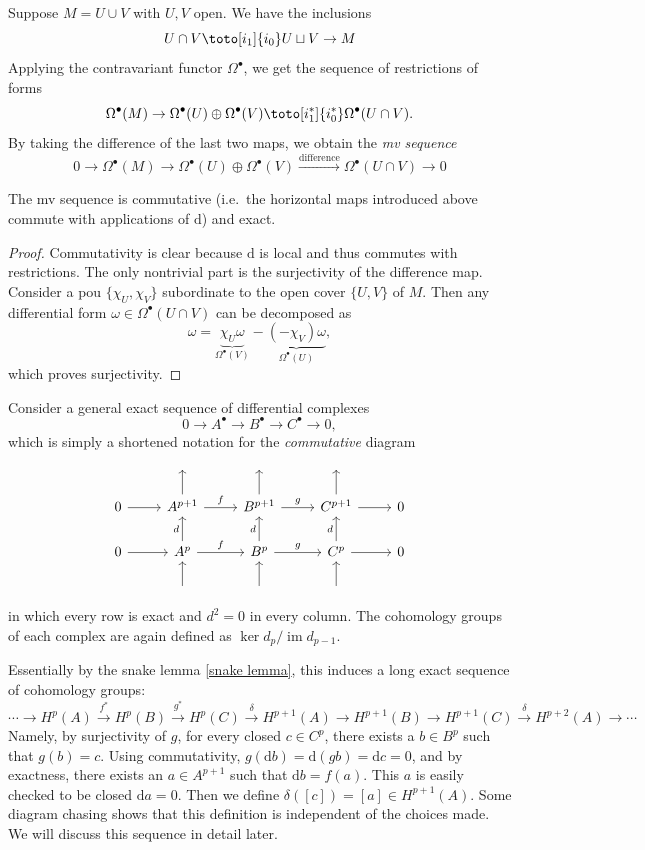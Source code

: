\documentclass[english,letterpaper]{article}%
\numberwithin{equation}{section}
\numberwithin{figure}{section}
\numberwithin{table}{section}
\theoremstyle{definition}
\theoremstyle{definition}
\theoremstyle{definition}
\theoremstyle{plain}
\theoremstyle{plain}
\theoremstyle{plain}
\theoremstyle{plain}
\theoremstyle{remark}
\theoremstyle{remark}
\newcommand{\dd}{{\mathrm{d}}}
\DeclareMathOperator{\im}{im}
\begin{document}
Suppose $M=U\cup V$ with $U,V$ open. We have the inclusions
\[U\cap V\toto[i_1]{i_0}U\sqcup V\to M \]
Applying the contravariant functor $\Omega^\bullet$, we get the sequence of restrictions of forms
\[\Omega^\bullet(M)\to \Omega^\bullet(U)\oplus\Omega^\bullet(V)\toto[i_1^\ast]{i_0^\ast}\Omega^\bullet(U\cap V).\]
By taking the difference of the last two maps, we obtain the \emph{\gls{mv} sequence}
\[0\to\Omega^\bullet (M)\to\Omega^\bullet(U)\oplus\Omega^\bullet(V)\overset{\text{difference}}\longrightarrow\Omega^\bullet (U\cap V)\to 0\]

\begin{prop}
    The \gls{mv} sequence is commutative (i.e.\ the horizontal maps introduced above commute with applications of $\dd$) and exact.
\end{prop}
\begin{proof}
    Commutativity is clear because $\dd$ is local and thus commutes with restrictions. The only nontrivial part is the surjectivity of the difference map. Consider a \gls{pou} $\{\chi_U,\chi_V\}$ subordinate to the open cover $\{U,V\}$ of $M$. Then any differential form $\omega\in\Omega^\bullet(U\cap V)$ can be decomposed as 
    \[\omega=\underbrace{\chi_U\omega}_{\Omega^\bullet(V)}-\underbrace{(-\chi_V)\omega}_{\Omega^\bullet(U)},\]
    which proves surjectivity.
\end{proof}

Consider a general exact sequence of differential complexes \[0\to A^\bullet\to B^\bullet\to C^\bullet \to 0,\] which is simply a shortened notation for the \emph{commutative} diagram
\[\begin{tikzcd}
        \; & \; & \; &\; &\; \\
        0 \arrow[r]& A^{p+1}\arrow[r,"f"]\arrow[u] &B^{p+1}\arrow[u]\arrow[r,"g"]& C^{p+1}\arrow[r]\arrow[u]& 0\\
       0\arrow[r] & A^p\arrow[r,"f"]\arrow[u,"d"] &B^p\arrow[u,"d"]\arrow[r,"g"]&C^p\arrow[u,"d"]\arrow[r]&0 \\
        &\arrow[u] & \arrow[u]& \arrow[u] &
\end{tikzcd}\]
in which every row is exact and $d^2=0$ in every column. The cohomology groups of each complex are again defined as $\ker d_{p}/\im d_{p-1}$. 

Essentially by the snake lemma \ref{snake lemma}, this induces a long exact sequence of cohomology groups:
\[\cdots\to H^p(A)\overset{f^\ast}\to H^p(B)\overset{g^\ast}\to H^p(C)\overset\delta\to H^{p+1}(A)\to H^{p+1}(B)\to H^{p+1}(C)\overset\delta\to H^{p+2}(A)\to \cdots\]
Namely, by surjectivity of $g$, for every closed $c\in C^p$, there exists a $b\in B^p$ such that $g(b)=c$. Using commutativity,  $g(\dd b)=\dd (gb)=\dd c=0$, and by exactness, there exists an $a\in A^{p+1}$ such that $\dd b=f(a)$. This $a$ is easily checked to be closed $\dd a=0$. Then we define $\delta([c])=[a]\in H^{p+1}(A)$. Some diagram chasing shows that this definition is independent of the choices made. We will discuss this sequence in detail later.
\end{document}
